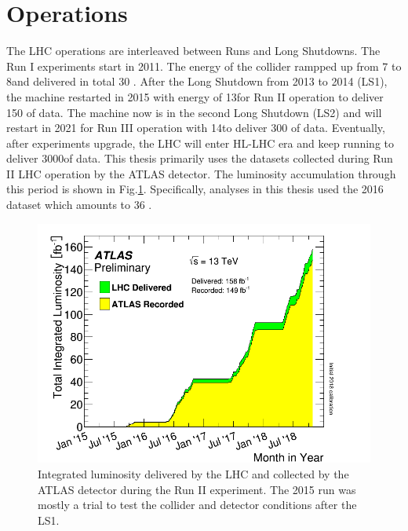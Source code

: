 \section{Operations}

The LHC operations are interleaved between Runs and Long Shutdowns. The Run I experiments start in 2011. The energy of the collider rampped up from 7 to 8\tev and delivered in total 30 \ifb. After the Long Shutdown from 2013 to 2014 (LS1), the machine restarted in 2015 with energy of 13\tev for Run II operation to deliver 150 \ifb of data. The machine now is in the second Long Shutdown (LS2) and will restart in 2021 for Run III operation with 14\tev to deliver 300 \ifb of data. Eventually, after experiments upgrade, the LHC will enter HL-LHC era and keep running to deliver 3000\ifb of data. This thesis primarily uses the datasets collected during Run II LHC operation by the ATLAS detector. The luminosity accumulation through this period is shown in Fig.\ref{fig:lhc-lumi}. Specifically, analyses in this thesis used the 2016 dataset which amounts to 36 \ifb.


\begin{figure}[htpb!]
\begin{center}
  \includegraphics[width=0.6\linewidth]{figures/LHC/intlumivstimeRun2.png}
\caption{Integrated luminosity delivered by the LHC and collected by the ATLAS detector during the Run II experiment. The 2015 run was mostly a trial to test the collider and detector conditions after the LS1.}
\label{fig:lhc-lumi}
\end{center}
\end{figure}
